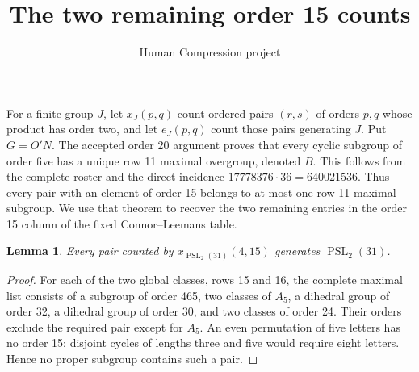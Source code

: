 \documentclass[11pt,a4paper]{article}
\title{The two remaining order 15 counts}
\author{Human Compression project}\date{}
\newtheorem{lemma}{Lemma}\newtheorem{theorem}{Theorem}
\begin{document}
\maketitle
For a finite group $J$, let $x_J(p,q)$ count ordered pairs $(r,s)$
of orders $p,q$ whose product has order two, and let $e_J(p,q)$
count those pairs generating $J$. Put $G=O'N$. The accepted
order 20 argument proves that every cyclic subgroup of order five
has a unique row 11 maximal overgroup, denoted $B$. This follows
from the complete roster and the direct incidence
$17778376\cdot36=640021536$. Thus every pair with an element of
order 15 belongs to at most one row 11 maximal subgroup.
We use that theorem to recover the two remaining entries in the
order 15 column of the fixed Connor--Leemans table.

\begin{lemma}\label{projective}
Every pair counted by $x_{\operatorname{PSL}_2(31)}(4,15)$
generates $\operatorname{PSL}_2(31)$.
\end{lemma}
\begin{proof}
For each of the two global classes, rows 15 and 16, the complete
maximal list consists of a subgroup of order 465, two classes
of $A_5$, a dihedral group of order 32, a dihedral group of
order 30, and two classes of order 24. Their orders exclude
the required pair except for $A_5$. An even permutation of five
letters has no order 15: disjoint cycles of lengths three and
five would require eight letters. Hence no proper subgroup
contains such a pair.
\end{proof}
\end{document}

